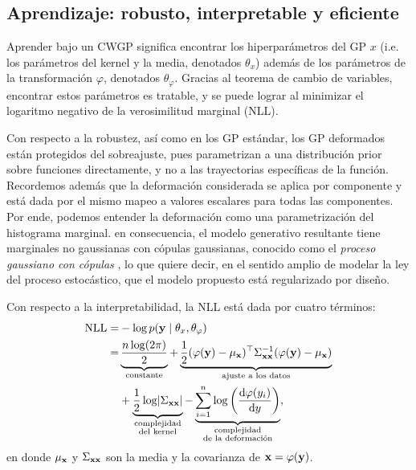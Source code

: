 \subsection{Aprendizaje: robusto, interpretable y eficiente}
\label{sub:sampling}

Aprender bajo un CWGP significa encontrar los hiperparámetros del GP \(x\) (i.e. los parámetros del kernel y la media, denotados \(\theta_x\)) además de los parámetros de la transformación \(\varphi\), denotados \(\theta_\varphi\). Gracias al teorema de cambio de variables, encontrar estos parámetros es tratable, y se puede lograr al minimizar el logaritmo negativo de la verosimilitud marginal (NLL).

Con respecto a la robustez, así como en los GP estándar, los GP deformados están protegidos del sobreajuste, pues parametrizan a una distribución prior sobre funciones directamente, y no a las trayectorias específicas de la función. Recordemos además que la deformación considerada se aplica por componente y está dada por el mismo mapeo a valores escalares para todas las componentes. Por ende, podemos entender la deformación como una parametrización del histograma marginal. en consecuencia, el modelo generativo resultante tiene marginales no gaussianas con cópulas gaussianas, conocido como el \emph{proceso gaussiano con cópulas} \cite{wilson2010copula}, lo que quiere decir, en el sentido amplio de modelar la ley del proceso estocástico, que el modelo propuesto está regularizado por diseño.

Con respecto a la interpretabilidad, la NLL está dada por cuatro términos:
\begin{align}
\label{eq:NLL}
	\mathrm{NLL}	=& -\log p(\mathbf{y} \mid \theta_x, \theta_\varphi)\\
					=& \underbrace{\frac{n \log(2\pi)}{2}}_{\text{constante}} + \underbrace{\frac{1}{2}(\varphi(\mathbf{y}) - \mu_{\mathbf{x}})^{\top} \Sigma_{\mathbf{x} \mathbf{x}}^{-1} (\varphi(\mathbf{y})-\mu_{\mathbf{x}})}_{\text{ajuste a los datos}} \nonumber\\
					&+ \underbrace{\frac{1}{2} \log \lvert \Sigma_{\mathbf{x} \mathbf{x}} \rvert}_{\substack{\text{complejidad} \\ \text{del kernel}}} - \underbrace{\sum_{i=1}^{n} \log\left( \dv{\varphi(y_{i})}{y} \right)}_{\substack{\text{complejidad} \\ \text{de la deformación}}},
	\nonumber
\end{align}
en donde \(\mu_{\mathbf{x}}\) y \(\Sigma_{\mathbf{x} \mathbf{x}}\) son la media y la covarianza de \(\mathbf{x} = \varphi(\mathbf{y})\).

